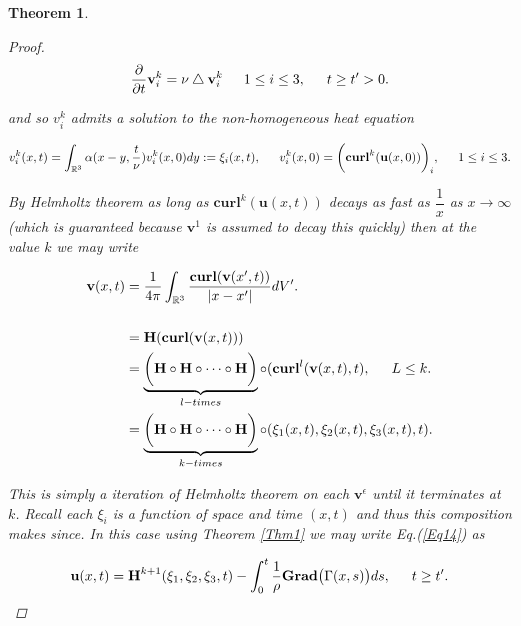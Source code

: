 \documentclass[amsmath,12pt,a4paper]{amsart}
\newtheorem{theorem}{Theorem}
\begin{document}
\begin{theorem}
\begin{proof}
\begin{equation}\label{Eq16}
\dfrac{\partial}{\partial t} \textbf{v}_i^k  = \nu \bigtriangleup \textbf{v}_i^k\indent 1\le i \le 3, \indent t\ge t^\prime>0.
\end{equation} 

and so $v_i^k$ admits a solution to the non-homogeneous heat equation 


\begin{equation}\label{Eq17}
v_i^k(x,t)  = \int_{\mathbb{R}^3}^{}{\alpha(x-y,\dfrac{t}{\nu})v^k_i(x,0)}dy:= \xi_i(x,t), \indent v^k_i(x,0) = \biggl(\textbf{curl}^k(\textbf{u}(x,0))\biggr)_i, \indent 1\le i\le 3.
\end{equation} 


By Helmholtz theorem as long as $\textbf{curl}^k(\textbf{u}(x,t))$ decays as fast as $\dfrac{1}{x}$ as $x\rightarrow \infty$  (which is guaranteed because $\textbf{v}^1$ is assumed to decay this quickly) then at the value $k$ we may write  


\begin{equation}\label{Eq18}
\begin{split}
\textbf{v}(x,t)  & = \dfrac{1}{4\pi} \int_{\mathbb{R}^3}^{}{\dfrac{\textbf{curl}(\textbf{v}(x^\prime,t))}{|x-x^\prime|}}dV^\prime. \\\\
&=  \textbf{H}(\textbf{curl}(\textbf{v}(x,t)))\\
& = \underbrace{\biggl(\textbf{H}\circ \textbf{H}\circ \cdots \circ \textbf{H}\biggr)}_{l-times}\circ(\textbf{curl}^l(\textbf{v}(x,t),t), \indent L \le k.\\
& = \underbrace{\biggl(\textbf{H}\circ \textbf{H}\circ \cdots \circ \textbf{H}\biggr)}_{k-times}\circ(\xi_1(x,t),\xi_2(x,t),\xi_3(x,t),t).\\
\end{split}
\end{equation} 

This is simply a iteration of Helmholtz theorem on each $\textbf{v}^\epsilon$ until it terminates at $k$. Recall each $\xi_i$ is a function of space and time $(x,t)$ and thus this composition makes since. In this case using Theorem \ref{Thm1} we may write Eq.(\ref{Eq14}) as 

\begin{equation}\label{Eq19}
 \textbf{u}(x,t) = \textbf{H}^{k+1}(\xi_1,\xi_2,\xi_3,t) -\int_{0}^{t}{\dfrac{1}{\rho}  \textbf{Grad}\big(\Gamma(x,s)\big)}ds, \indent t\ge t^\prime.
\end{equation}

\end{proof}
\end{theorem}
\end{document}
